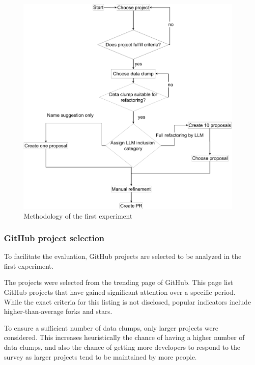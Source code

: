 \begin{figure}[ht!]
    \centering
    \includegraphics[width=1\columnwidth]{figures/chapter5/flowchart_expA.drawio.pdf}
    \caption{Methodology of the first experiment}
    \label{fig:flowchart_expA}
\end{figure}

\subsubsection{GitHub project selection}\label{sec:github_projects}

To facilitate the evaluation, GitHub projects are selected to be analyzed in the first experiment. 


The projects were selected from the trending page of GitHub. This page list GitHub projects that have gained significant attention over a specific  period. While the exact criteria for this listing is not disclosed, popular indicators include higher-than-average forks and stars.

To ensure a sufficient number of data clumps, only larger projects were considered. This increases heuristically the chance of having a higher number of data clumps, and also the chance of getting more developers to respond to the survey as larger projects tend to be maintained by more people. 

